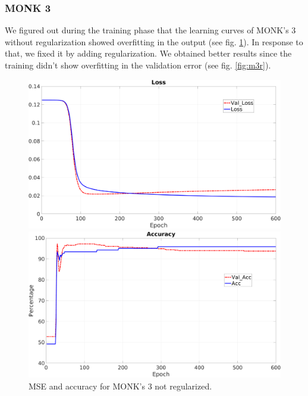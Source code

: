 \subsubsection{MONK 3}
We figured out during the training phase that the learning curves of MONK's 3 without regularization showed overfitting in the output (see fig. \ref{fig:m3nr}). In response to that, we fixed it by adding regularization. We obtained better results since the training didn't show overfitting in the validation error (see fig. \ref{fig:m3r}).
\begin{figure}[H]
    \centering
    \begin{minipage}[t]{0.5\linewidth}
        \includegraphics[width=\linewidth]{img/Monk3_loss_noReg.png}

    \end{minipage}%
    \begin{minipage}[t]{0.5\linewidth}
        \includegraphics[width=\linewidth]{img/Monk3_accuracy_noReg.png}
    \end{minipage}
    \caption{MSE and accuracy for MONK’s 3 not regularized.}
    \label{fig:m3nr}
\end{figure}


